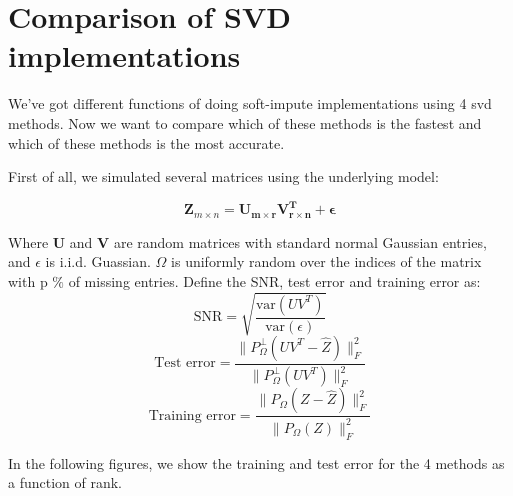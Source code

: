 \documentclass{article}
\begin{document}
	\section{Comparison of SVD implementations}
We've got different functions of doing soft-impute implementations using 4 svd methods. Now we want to compare which of these methods is the fastest and which of these methods is the most accurate.

First of all, we simulated several matrices using the underlying model:

$$
\mathbf{Z}_{m\times n} = \mathbf{U_{m\times  r}V^{T}_{r\times n} + \epsilon}
$$

Where $\mathbf{U}$ and $\mathbf{V}$ are random matrices with standard normal Gaussian entries, and $\epsilon $ is i.i.d. Guassian. $\Omega$ is uniformly random over the indices of the matrix with p $\%$ of missing entries.
Define the SNR, test error and training error as:
$$
\textrm{SNR} = \sqrt{\frac{\mathrm{var}(UV^T)}{\mathrm{var}(\epsilon)}}
$$
$$
\textrm{Test error} = \frac{\| P^{\perp}_{\Omega}(UV^T - \widehat{Z}) \|^2_F}{\| P^{\perp}_{\Omega}(UV^T) \|^2_F}
$$
$$
\textrm{Training error} = \frac{\| P_{\Omega}(Z - \widehat{Z}) \|^2_F}{\| P_{\Omega}(Z) \|^2_F}
$$

In the following figures, we show the training and test error for the 4 methods as a function of rank.
\end{document}
